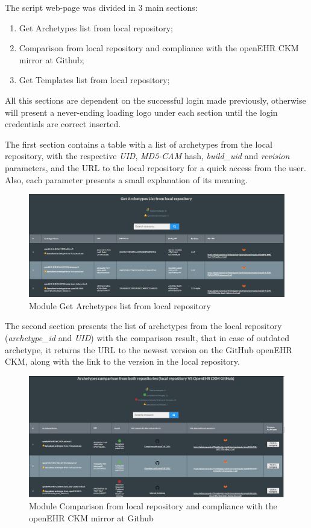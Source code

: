 \documentclass[mim_thesis.tex]{subfiles}
\begin{document}
The script web-page was divided in 3 main sections: 

\begin{enumerate}[noitemsep]
\item Get Archetypes list from local repository;
\item Comparison from local repository and compliance with the openEHR CKM mirror at Github;
\item Get Templates list from local repository; 
\end{enumerate}

All this sections are dependent on the successful login made previously, otherwise will present a never-ending loading logo under each section until the login credentials are correct inserted. 

The first section contains a table with a list of archetypes from the local repository, with the respective \textit{UID}, \textit{MD5-CAM} hash, \textit{build\_uid} and \textit{revision} parameters, and the URL to the local repository for a quick access from the user. Also, each parameter presents a small explanation of its meaning. 

\begin{figure}[H]
	\centering
    \includegraphics[width=1\textwidth]{img/get_arch_list.PNG}
	\caption{Module Get Archetypes list from local repository }
	\label{fig:get_arch_list}
\end{figure}

The second section presents the list of archetypes from the local repository (\textit{archetype\_id} and \textit{UID}) with the comparison result, that in case of outdated archetype, it returns the URL to the newest version on the GitHub openEHR CKM, along with the link to the version in the local repository. 

\begin{figure}[H]
	\centering
    \includegraphics[width=1\textwidth]{img/arch_comparison.PNG}
	\caption{Module Comparison from local repository and compliance with the openEHR CKM mirror at Github}
	\label{fig:arch_comparison}
\end{figure}
\end{document}

